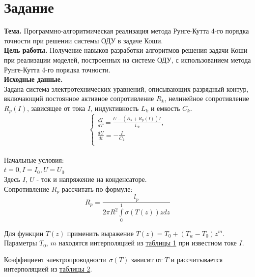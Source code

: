 \section*{Задание}

\qquad\textbf{Тема. } Программно-алгоритмическая реализация метода Рунге-Кутта 4-го порядка точности при решении системы ОДУ в задаче Коши.\\

\textbf{Цель работы. } Получение навыков разработки алгоритмов решения задачи Коши при реализации моделей, построенных на системе ОДУ, с использованием метода Рунге-Кутта
4-го порядка точности. \\

\textbf{Исходные данные. }\\
Задана система электротехнических уравнений, описывающих разрядный контур, включающий постоянное активное сопротивление $R_k$, нелинейное сопротивление $R_p(I)$, зависящее от тока $I$, индуктивность $L_k$ и емкость $C_k$.\\
\begin{equation}\label{formula1}
	\left\{
	\begin{array}{ccc}
		\frac{dI}{dT} = \frac{U - (R_k + R_p(I))I}{L_k},\\
		\frac{dU}{dt} = -\frac{I}{C_k}\\
	\end{array}
	\right.
\end{equation}\\

Начальные условия:\\
$t = 0, I = I_0, U = U_0$\\

Здесь $I$, $U$ - ток и напряжение на конденсаторе. \\
Сопротивление $R_p$ рассчитать по формуле:\\
\begin{equation}\label{formula2}
	R_p = \frac{l_p}{2\pi R^2 \int\limits_0^1 \sigma (T(z))zdz}
\end{equation}

Для функции $T(z)$ применить выражение $T(z) = T_0 + (T_w - T_0)z^m$.\\

Параметры $T_0$, $m$ находятся интерполяцией из \hyperref[table_1]{таблицы 1} при известном токе $I$.

Коэффициент электропроводности $\sigma(T)$ зависит от $T$ и рассчитывается интерполяцией из \hyperref[table_2]{таблицы 2}. \\

